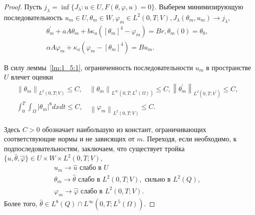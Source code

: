 \begin{proof}
    Пусть $j_{\lambda}=\inf \{ J_{\lambda} : u \in U, F(\theta, \varphi, u)=0\}$.
    Выберем минимизирующую последовательность
    $u_{m} \in U, \theta_{m} \in W, \varphi_{m} \in L^{2}(0, T; V),
    J_{\lambda}\left(\theta_{m}, u_{m}\right) \rightarrow j_{\lambda}$,
    \begin{equation}
        \label{eq:2_3:13}
        \begin{gathered}
            \theta_{m}^{\prime}+a A \theta_{m}
            + b \kappa_{a}\left(\left[\theta_{m}\right]^{4}
            - \varphi_{m}\right)=B r, \theta_{m}(0)=\theta_{0}, \\
            \alpha A \varphi_{m}+\kappa_{a}\left(\varphi_{m}-
            \left[\theta_{m}\right]^{4}\right)=B u_{m}.
        \end{gathered}
    \end{equation}

    В силу леммы~\ref{lm:1_5:1}, ограниченность последовательности $u_{m}$
    в пространстве $U$ влечет оценки
    \[
        \begin{gathered}
            \left\|\theta_{m}\right\|_{L^{2}(0, T ; V)} \leq C,
            \quad\left\|\theta_{m}\right\|_{L^{\infty}\left(0, T; L^{5}(\Omega)\right)} \leq C,
            \left\|\theta_{m}^{\prime}\right\|_{L^{2}\left(0, T; V^{\prime}\right)} \leq C, \\
            \int_{0}^{T} \int_{\Omega}\left|\theta_{m}\right|^{8} d x d t \leq C,
            \quad\left\|\varphi_{m}\right\|_{L^{2}(0, T ; V)} \leq C.
        \end{gathered}
    \]

    Здесь $C>0$ обозначает наибольшую из констант,
    ограничивающих соответствующие нормы и не зависящих от $m$.
    Переходя, если необходимо, к подпоследовательностям, заключаем, что существует тройка
    $\{\widehat{u}, \widehat{\theta}, \widehat{\varphi}\}
    \in U \times W \times L^{2}(0, T; V)$,
    \[
        \begin{gathered}
            u_{m} \rightarrow \widehat{u} \text { слабо в } U \\
            \theta_{m} \rightarrow \widehat{\theta}
            \text{ слабо в } L^{2}(0, T; V), \text { сильно в } L^{2}(Q), \\
            \varphi_{m} \rightarrow \widehat{\varphi}
            \text{ слабо в }  L^{2}(0, T ; V).
        \end{gathered}
    \]
    Более того, $\widehat{\theta} \in L^{8}(Q) \cap L^{\infty}\left(0, T ; L^{5}(\Omega)\right)$.



\end{proof}
